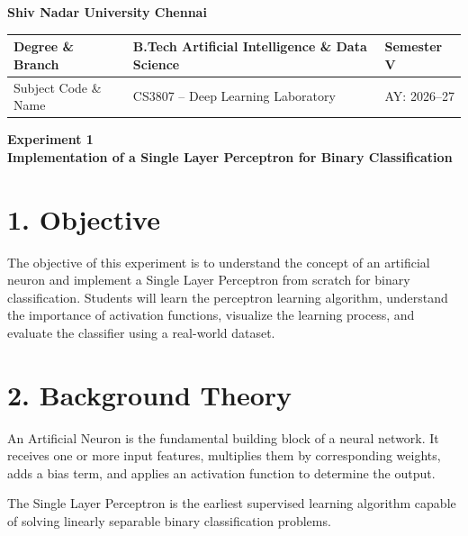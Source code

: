 \documentclass[11pt]{article}
\begin{document}
\begin{center}
\Large\textbf{Shiv Nadar University Chennai}\\[2mm]
\end{center}

\renewcommand{\arraystretch}{1.4}

\begin{tabular}{|p{3.5cm}|p{8cm}|p{2cm}|}
\hline
Degree \& Branch & B.Tech Artificial Intelligence \& Data Science & Semester V\\ \hline
Subject Code \& Name & CS3807 -- Deep Learning Laboratory & AY: 2026--27\\ \hline
\end{tabular}

\vspace{3mm}

\begin{center}
\Large\textbf{Experiment 1}\\
\large\textbf{Implementation of a Single Layer Perceptron for Binary Classification}
\end{center}


\section*{1. Objective}

The objective of this experiment is to understand the concept of an artificial neuron and implement a Single Layer Perceptron from scratch for binary classification. Students will learn the perceptron learning algorithm, understand the importance of activation functions, visualize the learning process, and evaluate the classifier using a real-world dataset.



\section*{2. Background Theory}

An Artificial Neuron is the fundamental building block of a neural network. It receives one or more input features, multiplies them by corresponding weights, adds a bias term, and applies an activation function to determine the output.

The Single Layer Perceptron is the earliest supervised learning algorithm capable of solving linearly separable binary classification problems.
\end{document}
